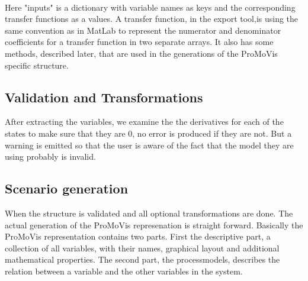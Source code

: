 \\\newline Here "inputs" is a dictionary with variable names as keys and the corresponding transfer functions as a values. A transfer function, in the export tool,is using the same convention as in MatLab to represent the numerator and denominator coefficients for a transfer function in two separate arrays. It also has some methods, described later, that are used in the generations of the ProMoVis specific structure. 


\subsection{Validation and Transformations}
After extracting the variables, we examine the the derivatives for each of the states to make sure that they are 0, no error is produced if they are not. But a warning is emitted so that the user is aware of the fact that the model they are using probably is invalid.
\subsection{Scenario generation}
When the structure is validated and all optional transformations are done. The actual generation of the ProMoVis represenation is straight forward. Basically the ProMoVis representation contains two parts. First the descriptive part, a collection of all variables, with their names, graphical layout and additional mathematical properties. The second part,  the processmodels, describes the relation between a variable and the other variables in the system. 
